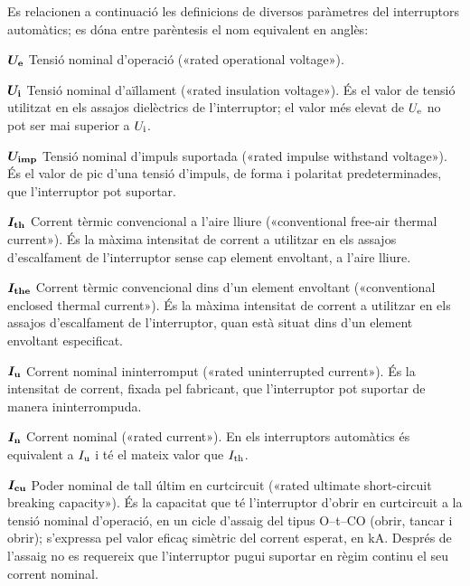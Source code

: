 Es relacionen a continuació les definicions de diversos paràmetres del interruptors automàtics; es dóna entre parèntesis el nom equivalent en anglès:
\begin{list}{}
   {\setlength{\labelwidth}{10mm} \setlength{\leftmargin}{10mm} \setlength{\labelsep}{2mm}}
   \item[$\boldsymbol{U_\mathrm{e}}$] Tensió nominal d'operació («rated operational voltage»).
   \item[$\boldsymbol{U_\mathrm{i}}$] Tensió nominal d'aïllament («rated insulation voltage»). És el valor de tensió utilitzat en els assajos dielèctrics de l'interruptor;  el valor més elevat de $U_\mathrm{e}$ no pot ser mai superior a $U_\mathrm{i}$.
    \item[$\boldsymbol{U_\mathrm{imp}}$] Tensió nominal d'impuls suportada («rated impulse withstand voltage»). És el valor de pic d'una tensió d'impuls, de forma i polaritat predeterminades, que l'interruptor pot suportar.
   \item[$\boldsymbol{I_\mathrm{th}}$] Corrent tèrmic convencional a l'aire lliure («conventional free-air thermal current»).  És la  màxima intensitat de corrent a utilitzar en els assajos d'escalfament de l'interruptor sense cap element envoltant, a l'aire lliure.
   \item[$\boldsymbol{I_\mathrm{the}}$] Corrent tèrmic convencional dins d'un element envoltant («conventional enclosed thermal current»).  És la màxima intensitat de corrent a utilitzar en els assajos d'escalfament de l'interruptor, quan està situat dins d'un element envoltant especificat.
    \item[$\boldsymbol{I_\mathrm{u}}$] Corrent nominal ininterromput («rated uninterrupted current»).  És la intensitat  de corrent, fixada pel fabricant, que l'interruptor pot suportar de manera ininterrompuda.
    \item[$\boldsymbol{I_\mathrm{n}}$] Corrent nominal («rated current»).  En els interruptors automàtics és equivalent a $I_\mathrm{u}$ i té el mateix valor que $I_\mathrm{th}$.
    \item[$\boldsymbol{I_\mathrm{cu}}$] Poder nominal de tall últim en curtcircuit («rated ultimate  short-circuit breaking capacity»). És la capacitat que té l'interruptor d'obrir en curtcircuit a la tensió nominal d'operació, en un cicle d'assaig del tipus O--t--CO (obrir, tancar i obrir); s'expressa pel valor eficaç simètric del corrent esperat, en kA. Després de l'assaig no es requereix que l'interruptor pugui suportar en règim continu el seu corrent nominal.

\end{list}
